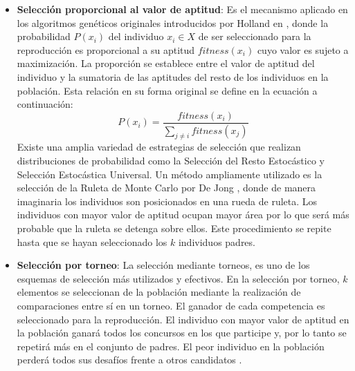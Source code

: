 \begin{itemize}
\item \textbf{Selección proporcional al valor de aptitud}: Es el mecanismo aplicado en los algoritmos genéticos originales introducidos por Holland en \cite{holland1992adaptation}, donde la probabilidad $P (x_i)$ del individuo $x_i \in X$ de ser seleccionado para la reproducción es proporcional a su aptitud $fitness (x_i)$ cuyo valor es sujeto a maximización. La proporción se establece entre el valor de aptitud del individuo y la sumatoria de las aptitudes del resto de los individuos en la población. Esta relación en su forma original se define en la ecuación a continuación:
\begin{equation} \label{key}
   P(x_i)= \frac{fitness(x_i)}{\sum_{j\neq i}{fitness(x_j)}}
\end{equation}
Existe una amplia variedad de estrategias de selección que realizan distribuciones de probabilidad como la Selección del Resto Estocástico y Selección Estocástica Universal. Un método ampliamente utilizado es la selección de la Ruleta de Monte Carlo por De Jong \cite{de1975analysis}, donde de manera imaginaria los individuos son posicionados en una rueda de ruleta. Los individuos con mayor valor de aptitud  ocupan mayor área por lo que será más probable que la ruleta se detenga sobre ellos. Este procedimiento se repite hasta que se hayan seleccionado los $k$ individuos padres. 
\item \textbf{Selección por torneo}: La selección mediante torneos, es uno de los esquemas de selección más utilizados y efectivos. En la selección por torneo, $k$ elementos se seleccionan de la población mediante la realización de comparaciones entre sí en un torneo. El ganador de cada competencia es seleccionado para la reproducción. El individuo con mayor valor de aptitud en la población ganará todos los concursos en los que participe y, por lo tanto se repetirá más en el conjunto de padres. El peor individuo en la población perderá todos sus desafíos frente a otros candidatos \cite{weise2009global}.

\end{itemize}


